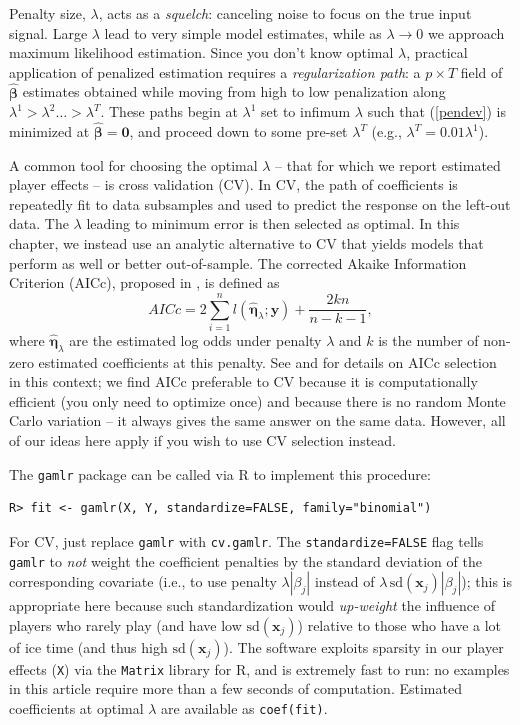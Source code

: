 Penalty size, $\lambda$, acts as a {\it squelch}: canceling noise to
focus on the true input signal. Large $\lambda$ lead to very simple  model
estimates, while as $\lambda \rightarrow 0$ we approach maximum likelihood
estimation. Since you don't know optimal $\lambda$, practical
application of penalized estimation requires a {\it regularization path}: a $p
\times T$ field of $\boldsymbol{\hat\beta}$ estimates obtained while moving
from high to low penalization along $\lambda^1 > \lambda^2 \ldots >
\lambda^T$. These paths begin at $\lambda^1$ set to infimum $\lambda$ such
that (\ref{pendev}) is minimized at $\boldsymbol{\hat\beta} = \mathbf{0}$, and proceed
down to some pre-set $\lambda^T$ (e.g., $\lambda^T= 0.01\lambda^1$).

 A common tool for choosing the optimal $\lambda$ -- that for which we report
 estimated player effects -- is cross validation (CV).  In CV, the path of
 coefficients is repeatedly fit to data subsamples and used to predict the
 response on the left-out data. The $\lambda$ leading to minimum error is then
 selected as optimal.  In this chapter, we instead use an analytic alternative
 to CV that yields models that perform as well or better out-of-sample.   The
 corrected Akaike Information Criterion (AICc), proposed in
 \cite{hurvich_regression_1989}, is defined as
\begin{equation*}
AICc = 2\sum_{i=1}^{n} l(\boldsymbol{\hat\eta}_{\lambda};\mathbf{y}) + \frac{2kn}{n-k-1},
\end{equation*}
where $\boldsymbol{\hat\eta}_{\lambda}$ are the estimated log odds under
penalty $\lambda$ and $k$ is the number of non-zero estimated coefficients at
this penalty. See \cite{taddy_one-step_2015} and \cite{flynn_efficiency_2013}
for details on AICc selection in this context; we find AICc preferable to CV
because it is computationally efficient (you only need to optimize once) and
because there is no random Monte Carlo variation -- it always gives the same
answer on the same data.  However, all of our ideas here apply if you wish to
use CV selection instead. 

The {\tt gamlr} package \cite{gamlr} can
be called via {\sf R} to implement this procedure:
\begin{verbatim}
R> fit <- gamlr(X, Y, standardize=FALSE, family="binomial")
\end{verbatim}
For CV, just replace \verb!gamlr! with \verb!cv.gamlr!. The
\verb!standardize=FALSE! flag tells \verb!gamlr! to \textit{not} weight the
coefficient penalties by the standard deviation of the corresponding covariate
(i.e., to use penalty $\lambda|\beta_j|$ instead of
$\lambda\,\mathrm{sd}(\mathbf{x}_j)|\beta_j|$); this is appropriate here because
such standardization would \textit{up-weight} the influence of players who
rarely play (and have low $\mathrm{sd}(\mathbf{x}_j)$) relative to those who
have a lot of ice time (and thus high $\mathrm{sd}(\mathbf{x}_j)$).  The
software exploits sparsity in our player effects (\verb!X!) via the
\verb!Matrix! library for {\sf R}, and is extremely fast to run: no examples
in this article require more than a few seconds of computation. Estimated
coefficients at optimal $\lambda$ are available as \verb!coef(fit)!.


